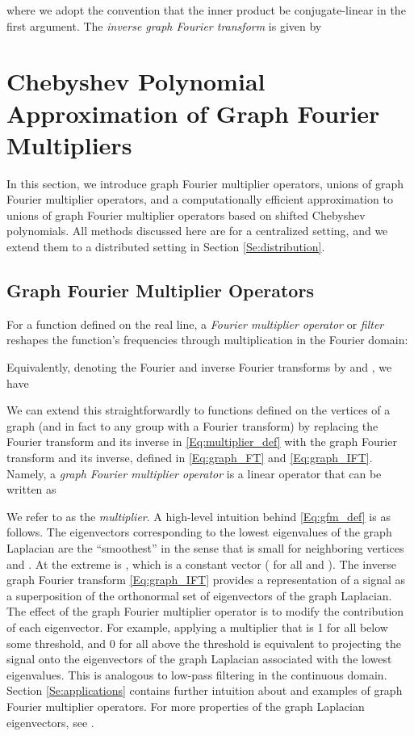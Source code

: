 \documentclass[conference]{IEEEtran}
\begin{document}
where we adopt the convention that the inner product be
  conjugate-linear in the first argument. The \emph{inverse graph Fourier transform} is given by



\section{Chebyshev Polynomial Approximation of Graph Fourier Multipliers} \label{Se:GFM}
In this section, we introduce graph Fourier multiplier operators, unions of graph Fourier multiplier operators, and a computationally efficient approximation to unions of graph Fourier multiplier operators based on shifted Chebyshev polynomials.
All methods discussed here are for
a centralized setting, and we extend them to a distributed setting in Section \ref{Se:distribution}.



\subsection{Graph Fourier Multiplier Operators} \label{Se:gfmo}
For a function  defined on the real line,
a \emph{Fourier multiplier operator} or \emph{filter}  reshapes the function's
frequencies through multiplication in the Fourier domain:

Equivalently,
denoting the Fourier and inverse Fourier transforms by  and , we have



We can extend this straightforwardly to functions defined on the vertices of a graph (and in fact to any group with a Fourier transform) by replacing the Fourier transform and its inverse in \eqref{Eq:multiplier_def} with the graph Fourier transform and its inverse, defined in \eqref{Eq:graph_FT} and \eqref{Eq:graph_IFT}. Namely, a \emph{graph Fourier multiplier operator} is a linear operator  that can be written as

We refer to  as the \emph{multiplier}. A high-level intuition behind \eqref{Eq:gfm_def} is as follows. The eigenvectors corresponding to the lowest eigenvalues of the graph Laplacian are the ``smoothest'' in the sense that  is small for neighboring vertices  and . At the extreme is , which is a constant vector ( for all  and ). The inverse graph Fourier transform \eqref{Eq:graph_IFT} provides a representation of a signal  as a superposition of the orthonormal set of eigenvectors of the graph Laplacian.
The effect of
the graph Fourier multiplier operator  is to modify
the contribution of each eigenvector. For example, applying a multiplier  that is 1 for all  below some threshold, and 0 for all  above the threshold is equivalent to projecting the signal onto the eigenvectors of the graph Laplacian associated with the lowest eigenvalues. This is analogous to low-pass filtering in the continuous domain. Section \ref{Se:applications} contains further intuition about and examples of graph Fourier multiplier operators. For more properties of the graph Laplacian eigenvectors, see \cite{lap_eigen}.
\end{document}
